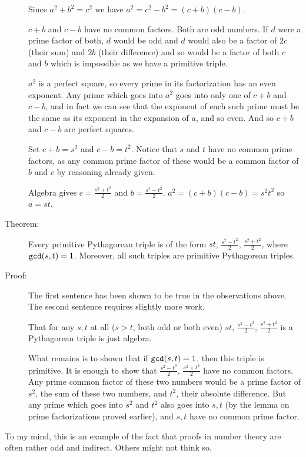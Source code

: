 \documentclass[12pt]{article}
\begin{document}
\begin{description}
Since $a^2+b^2=c^2$ we have $a^2=c^2-b^2=(c+b)(c-b)$.

$c+b$ and $c-b$ have no common factors.  Both are odd numbers.   If $d$ were a prime factor of both,
$d$ would be odd and $d$ would also be a factor of $2c$ (their sum) and $2b$ (their difference) and so would be
a factor of both $c$ and $b$ which is impossible as we have a primitive triple.

$a^2$ is a perfect square, so every prime in its factorization has an even exponent.  Any prime which goes
into $a^2$ goes into only one of $c+b$ and $c-b$, and in fact we can see that the exponent of each such prime must be the same as its exponent in the expansion of $a$, and so even.  And so $c+b$ and $c-b$ are perfect squares.

Set $c+b = s^2$ and $c-b=t^2$.   Notice that $s$ and $t$ have no common prime factors, as any common prime factor of these would be a common factor of $b$ and $c$ by reasoning already given.

Algebra gives $c=\frac{s^2+t^2}2$ and $b=\frac{s^2-t^2}2$.  $a^2=(c+b)(c-b)=s^2t^2$ so $a=st$.

\item[Theorem:]   Every primitive Pythagorean triple is of the form $st$, $\frac{s^2-t^2}2$, $\frac{s^2+t^2}2$,
where ${\tt gcd}(s,t)=1$.   Moreover, all such triples are primitive Pythagorean triples.

\item[Proof:]   The first sentence has been shown to be true in the observations above.  The second sentence
requires slightly more work.

That for any $s,t$ at all  ($s>t$, both odd or both even) $st$, $\frac{s^2-t^2}2$, $\frac{s^2+t^2}2$ is a Pythagorean triple is just algebra.

What remains is to shown that if ${\tt gcd}(s,t)=1$, then this triple is primitive.   It is enough to show
that $\frac{s^2-t^2}2$, $\frac{s^2+t^2}2$ have no common factors.   Any prime common factor of these two
numbers would be a prime factor of $s^2$, the sum of these two numbers, and $t^2$, their absolute difference.
But any prime which goes into $s^2$ and $t^2$ also goes into $s,t$ (by the lemma on prime factorizations proved earlier), and $s,t$ have no common prime factor.

\end{description}

To my mind, this is an example of the fact that proofs in number theory are often rather odd and indirect.  Others might not think so.
\end{document}
